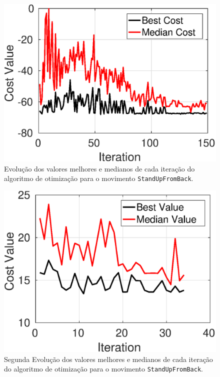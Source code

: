 \documentclass[
10pt, %
a4paper, %
oneside, %
headinclude,footinclude, %
BCOR5mm, %
]{scrartcl}
\newcommand*{\inlinecode}{\texttt}%
\begin{document}
\begin{figure}[htb]
\begin{center}
\includegraphics[scale=0.6]{getUpBackOptimization}
\end{center}
\caption{\label{fig:getUpBackOptimizationData}Evolução dos valores melhores e medianos de cada iteração do algoritmo de otimização para o movimento \inlinecode{StandUpFromBack}.}
\end{figure}

\begin{figure}[htb]
\begin{center}
\includegraphics[scale=0.6]{otimizacaocostas2}
\end{center}
\caption{\label{fig:getUpBackOptimizationData2}Segunda Evolução dos valores melhores e medianos de cada iteração do algoritmo de otimização para o movimento \inlinecode{StandUpFromBack}.}
\end{figure}
\end{document}
